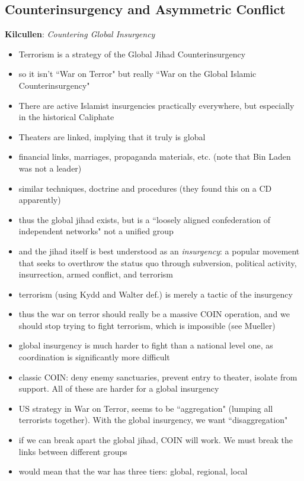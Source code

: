 \documentclass{article}
\begin{document}
\subsection*{Counterinsurgency and Asymmetric Conflict}
\textbf{Kilcullen}: \textit{Countering Global Insurgency}
\begin{itemize}
    \item Terrorism is a strategy of the Global Jihad Counterinsurgency
    \item so it isn't ``War on Terror" but really ``War on the Global Islamic Counterinsurgency"
    \item There are active Islamist insurgencies practically everywhere, but especially in the historical Caliphate
    \item Theaters are linked, implying that it truly is global
    \item financial links, marriages, propaganda materials, etc. (note that Bin Laden was not a leader)
    \item similar techniques, doctrine and procedures (they found this on a CD apparently)
    \item thus the global jihad exists, but is a ``loosely aligned confederation of independent networks" not a unified group
    \item and the jihad itself is best understood as an \textit{insurgency}: a popular movement that seeks to overthrow the status quo through subversion, political activity, insurrection, armed conflict, and terrorism
    \item terrorism (using Kydd and Walter def.) is merely a tactic of the insurgency
    \item thus the war on terror should really be a massive COIN operation, and we should stop trying to fight terrorism, which is impossible (see Mueller)
    \item global insurgency is much harder to fight than a national level one, as coordination is significantly more difficult
    \item classic COIN: deny enemy sanctuaries, prevent entry to theater, isolate from support. All of these are harder for a global insurgency
    \item US strategy in War on Terror, seems to be ``aggregation" (lumping all terrorists together). With the global insurgency, we want ``disaggregation"
    \item if we can break apart the global jihad, COIN will work. We must break the links between different groups
    \item would mean that the war has three tiers: global, regional, local

\end{itemize}
\end{document}
